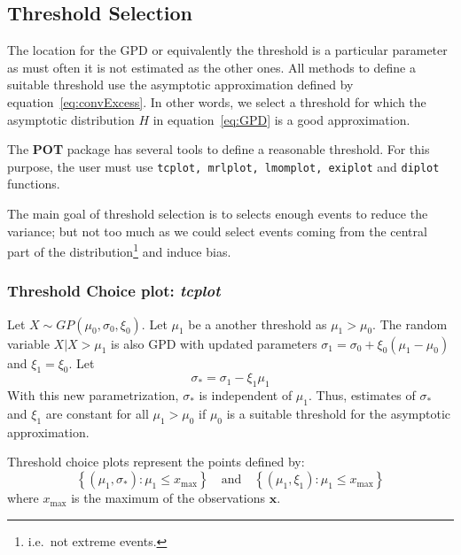\documentclass[11pt,a4paper]{article}
\numberwithin{equation}{section}
\theoremstyle{definition}
\begin{document}
\subsection{Threshold Selection}
\label{subsec:threshSelect}

The location for the GPD or equivalently the threshold is a particular
parameter as must often it is not estimated as the other ones. All
methods to define a suitable threshold use the asymptotic
approximation defined by equation~\eqref{eq:convExcess}. In other
words, we select a threshold for which the asymptotic distribution $H$
in equation~\eqref{eq:GPD} is a good approximation.

The \textbf{POT} package has several tools to define a reasonable
threshold. For this purpose, the user must use
\verb+tcplot, mrlplot, lmomplot, exiplot+ and \verb+diplot+ functions.

The main goal of threshold selection is to selects enough events to
reduce the variance; but not too much as we could select events coming
from the central part of the distribution\footnote{i.e.\ not extreme
  events.} and induce bias.

\subsubsection{Threshold Choice plot:  \emph{tcplot}}
\label{subsubsection:tcplot}

Let $X \sim GP(\mu_0, \sigma_0, \xi_0)$. Let $\mu_1$ be a another
threshold as $\mu_1 > \mu_0$. The random variable $X | X > \mu_1$ is
also GPD with updated parameters $\sigma_1 = \sigma_0 + \xi_0 ( \mu_1
- \mu_0)$ and $\xi_1 = \xi_0$.
Let
\begin{equation}
  \label{eq:reparamScale}
  \sigma_* = \sigma_1 - \xi_1 \mu_1
\end{equation}
With this new parametrization, $\sigma_*$ is independent of
$\mu_1$. Thus, estimates of $\sigma_*$ and $\xi_1$ are constant for
all $\mu_1 > \mu_0$ if $\mu_0$ is a suitable threshold for the
asymptotic approximation.

Threshold choice plots represent the points defined by:
\begin{equation}
  \label{eq:tcplot}
  \left\{\left(\mu_1, \sigma_*\right) : \mu_1 \leq x_\mathrm{max}
  \right\} \quad \text{and} \quad \left\{\left(\mu_1, \xi_1\right) :
    \mu_1 \leq x_\mathrm{max} \right\}
\end{equation}
where $x_\mathrm{max}$ is the maximum of the observations
$\mathbf{x}$.
\end{document}

